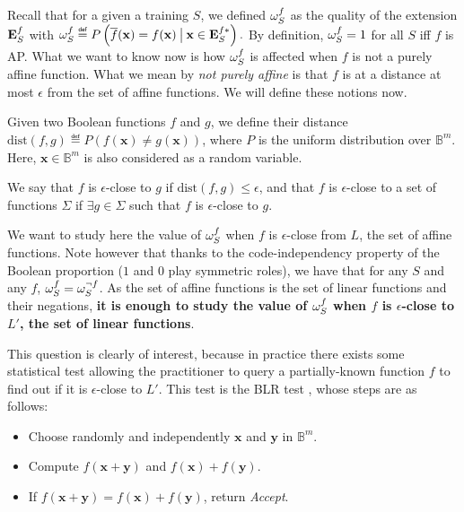 Recall that for a given a training $S$, we defined $\omega_{S}^{f}$ as the quality of the
extension $\mathbf{E}_{S}^{f}$ with $\omegasf \eqdef P\left(\albl{\mathbf{x}} = f(\mathbf{x})
\given[\big] \mathbf{x} \in \esfs\right).$ By definition, $\omega_{S}^{f}=1$ for all
$S$ iff $f$ is AP. What we want to know now is how $\omega_{S}^{f}$ is affected when
$f$ is not a purely affine function. What we
mean by \textit{not purely affine} is that $f$ is at a distance at most
$\epsilon$ from the set
of affine functions. We will define these notions now.

Given two Boolean functions $f$ and $g$, we define their distance
$\text{dist}(f, g) \eqdef P\left(f(\mathbf{x}) \neq
g(\mathbf{x})\right)$, where $P$ is the uniform distribution over
$\mathbb{B}^m$. Here, $\mathbf{x} \in \mathbb{B}^m$ is also considered as a
random variable.

\begin{definition}
We say that $f$ is $\epsilon$-close to $g$ if $\text{dist}(f, g) \leq
  \epsilon$, and that $f$ is $\epsilon$-close to a set of functions $\Sigma$ if
  $\exists g \in \Sigma$ such that $f$ is $\epsilon$-close to $g$.
\end{definition}

We want to study here the value of $\omega_{S}^{f}$ when $f$ is $\epsilon$-close from
$L$, the set of affine functions. Note however that thanks to the
code-independency property of the Boolean proportion ($1$ and $0$ play
symmetric roles), we have that for any $S$ and any $f$, $\omega_{S}^{f} =
\omega_S^{\neg f}$. As the set of affine functions is the set of linear
functions and their negations, \textbf{it is enough to study the value of
$\omega_{S}^{f}$ when $f$ is $\epsilon$-close to $L'$, the set of linear functions}.

This question is clearly of interest, because in practice there exists some
statistical test allowing the practitioner to query a partially-known function
$f$ to find out if it is $\epsilon$-close to $L'$. This test is the BLR test
\cite{BluLubRub93}, whose steps are as follows:

\begin{itemize}
\item Choose randomly and independently $\mathbf{x}$ and $\mathbf{y}$ in
  $\mathbb{B}^m$.
\item Compute $f(\mathbf{x}+\mathbf{y})$ and $f(\mathbf{x}) + f(\mathbf{y})$.
\item If $f(\mathbf{x}+\mathbf{y}) = f(\mathbf{x}) + f(\mathbf{y})$, return
  \textit{Accept}.
\end{itemize}

